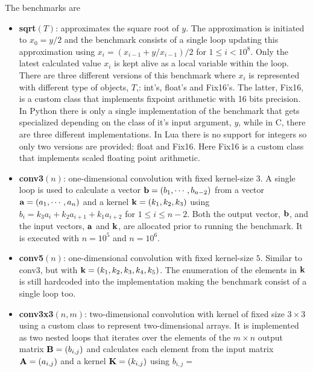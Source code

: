 \documentclass[preprint]{sigplanconf}
\begin{document}
The benchmarks are
\begin{itemize}
\item {\bf sqrt}$\left(T\right)$: approximates the square root of $y$. The approximation is 
initiated to $x_0=y/2$ and the benchmark consists of a single loop updating this
approximation using $x_i = \left( x_{i-1} + y/x_{i-1} \right) / 2$ for $1\leq i < 10^8$. 
Only the latest calculated value $x_i$ is kept alive as a local variable within the loop.
There are three different versions of this benchmark where $x_i$
  is represented with different type of objects, $T$,: int's, float's and
  Fix16's. The latter, Fix16, is a custom class that implements
  fixpoint arithmetic with 16 bits precision. In Python there is only
  a single implementation of the benchmark that gets specialized
  depending on the class of it's input argument, $y$, while in C,
  there are three different implementations. In Lua there is no support for
  integers so only two versions are provided: float and Fix16. Here Fix16 is a custom class
  that implements scaled floating point arithmetic.
\item {\bf conv3}$\left(n\right)$: one-dimensional convolution with fixed kernel-size $3$. A single loop
is used to calculate a vector ${\bf b} = \left(b_1, \cdots, b_{n-2}\right)$ from a vector
${\bf a} = \left(a_1, \cdots, a_n\right)$ and a kernel ${\bf k} = \left(k_1, k_2, k_3\right)$ using 
$b_i = k_3 a_i + k_2 a_{i+1} + k_1 a_{i+2}$ for $1 \leq i \leq n-2$. Both the output vector, $\bf b$, 
and the input vectors, $\bf a$ and $\bf k$, are allocated prior to running the benchmark. It is executed 
with $n=10^5$ and $n=10^6$.
\item {\bf conv5}$\left(n\right)$: one-dimensional convolution with fixed kernel-size $5$. Similar to conv3, but with 
${\bf k} = \left(k_1, k_2, k_3, k_4, k_5\right)$. The enumeration of the elements in $\bf k$ is still 
hardcoded into the implementation making the benchmark consist of a single loop too.
\item {\bf conv3x3}$\left(n,m\right)$: two-dimensional convolution with kernel of fixed
  size $3 \times 3$ using a custom class to represent two-dimensional
  arrays. It is implemented as two nested loops that iterates over the elements of the 
$m\times n$ output matrix ${\bf B} = \left(b_{i,j}\right)$ and calculates each element from the input matrix
${\bf A} = \left(a_{i,j}\right)$ and a kernel ${\bf K} = \left(k_{i,j}\right)$ using $b_{i,j} = $
\begin{equation}
  \label{eq:convsum}
  \begin{array}{lclclc}

\end{array}
\end{equation}
\end{itemize}
\end{document}
